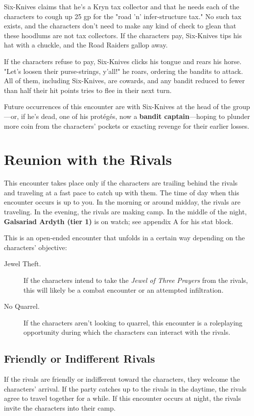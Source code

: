 \documentclass[10pt,a4paper,twoside,fancy,bg=print,twocolumn,openany,nodeprecatedcode]{dndbook}
\begin{document}
Six-Knives claims that he's a Kryn tax collector and that he needs each of the characters to cough up 25 gp for the "road 'n' infer-structure tax." No such tax exists, and the characters don't need to make any kind of check to glean that these hoodlums are not tax collectors. If the characters pay, Six-Knives tips his hat with a chuckle, and the Road Raiders gallop away.

If the characters refuse to pay, Six-Knives clicks his tongue and rears his horse. "Let's loosen their purse-strings, y'all!" he roars, ordering the bandits to attack. All of them, including Six-Knives, are cowards, and any bandit reduced to fewer than half their hit points tries to flee in their next turn.

Future occurrences of this encounter are with Six-Knives at the head of the group—or, if he's dead, one of his protégés, now a \textbf{bandit captain}—hoping to plunder more coin from the characters' pockets or exacting revenge for their earlier losses.

\section{Reunion with the Rivals}
This encounter takes place only if the characters are trailing behind the rivals and traveling at a fast pace to catch up with them. The time of day when this encounter occurs is up to you. In the morning or around midday, the rivals are traveling. In the evening, the rivals are making camp. In the middle of the night, \textbf{Galsariad Ardyth (tier 1)} is on watch; see appendix A for his stat block.

This is an open-ended encounter that unfolds in a certain way depending on the characters' objective:


\begin{description}
\item[Jewel Theft.]
If the characters intend to take the \textit{Jewel of Three Prayers} from the rivals, this will likely be a combat encounter or an attempted infiltration.
\item[No Quarrel.]
If the characters aren't looking to quarrel, this encounter is a roleplaying opportunity during which the characters can interact with the rivals.
\end{description}

\subsection{Friendly or Indifferent Rivals}
If the rivals are friendly or indifferent toward the characters, they welcome the characters' arrival. If the party catches up to the rivals in the daytime, the rivals agree to travel together for a while. If this encounter occurs at night, the rivals invite the characters into their camp.
\end{document}
